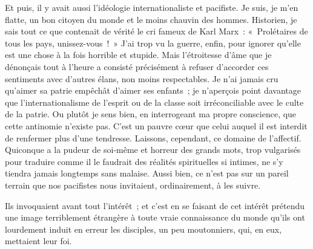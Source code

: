 \documentclass[french,twoside]{book} %
\begin{document}
Et puis, il y avait aussi l’idéologie internationaliste et pacifiste. Je suis, je m’en flatte, un bon citoyen du monde et le moins chauvin des hommes. Historien, je sais tout ce que contenait de vérité le cri fameux de Karl Marx : « Prolétaires de tous les pays, unissez-vous ! » J’ai trop vu la guerre, enfin, pour ignorer qu’elle est une chose à la fois horrible et stupide. Mais l’étroitesse d’âme que je dénonçais tout à l’heure a consisté précisément à refuser d’accorder ces sentiments avec d’autres élans, non moins respectables. Je n’ai jamais cru qu’aimer sa patrie   empêchât d’aimer ses enfants ; je n’aperçois point davantage que l’internationalisme de l’esprit ou de la classe soit irréconciliable avec le culte de la patrie. Ou plutôt je sens bien, en interrogeant ma propre conscience, que cette antinomie n’existe pas. C’est un pauvre cœur que celui auquel il est interdit de renfermer plus d’une tendresse. Laissons, cependant, ce domaine de l’affectif. Quiconque a la pudeur de soi-même et horreur des grands mots, trop vulgarisés pour traduire comme il le faudrait des réalités spirituelles si intimes, ne s’y tiendra jamais longtemps sans malaise. Aussi bien, ce n’est pas sur un pareil terrain que nos pacifistes nous invitaient, ordinairement, à les suivre.\par
Ils invoquaient avant tout l’intérêt ; et c’est en se faisant de cet intérêt prétendu une image terriblement étrangère à toute vraie connaissance du monde qu’ils ont lourdement induit en erreur les disciples, un peu moutonniers, qui, en eux, mettaient leur foi.\par
\end{document}
